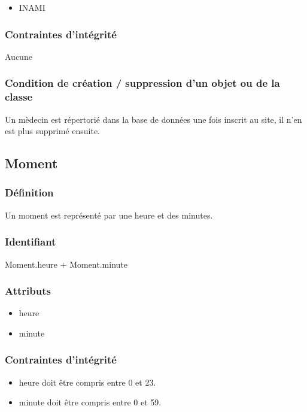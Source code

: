 \documentclass[a4paper, 11pt]{report}
\begin{document}
\begin{itemize}
    \item INAMI
\end{itemize}

\subsubsection{Contraintes d'intégrité}

Aucune

\subsubsection{Condition de création / suppression d'un objet ou de la classe}

Un mèdecin est répertorié dans la base de données une fois inscrit au site, il n'en est plus supprimé ensuite.

\subsection{Moment}

\subsubsection{Définition}

Un moment est représenté par une heure et des minutes.

\subsubsection{Identifiant}

Moment.heure + Moment.minute

\subsubsection{Attributs}

\begin{itemize}
    \item{heure}
    \item{minute}
\end{itemize}

\subsubsection{Contraintes d'intégrité}

\begin{itemize}
    \item heure doit être compris entre 0 et 23.
    \item minute doit être compris entre 0 et 59.
\end{itemize}
\end{document}
